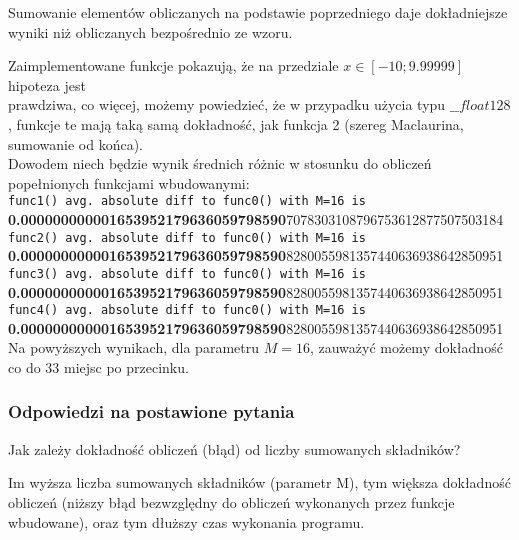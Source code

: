 \documentclass[12pt]{article}
\newenvironment{question}[2][Pytanie]{\begin{trivlist}
\item[\hskip \labelsep {\bfseries #1}\hskip \labelsep {\bfseries #2.}]}{\end{trivlist}}
\newenvironment{hypothesis}[2][Hipoteza]{\begin{trivlist}
\item[\hskip \labelsep {\bfseries #1}\hskip \labelsep {\bfseries #2.}]}{\end{trivlist}}
\begin{document}
\begin{hypothesis}{3}
Sumowanie elementów obliczanych na podstawie poprzedniego daje dokładniejsze wyniki niż obliczanych bezpośrednio ze wzoru.
\end{hypothesis}
Zaimplementowane funkcje pokazują, że na przedziale $x \in [-10;9.99999]$ hipoteza jest \\prawdziwa, co więcej, możemy powiedzieć, że w przypadku użycia typu $\_\_float128$, funkcje te mają taką samą dokładność, jak funkcja 2 (szereg Maclaurina, sumowanie od końca).\\
Dowodem niech będzie wynik średnich różnic w stosunku do obliczeń popełnionych funkcjami wbudowanymi:\\
\noindent\texttt{func1() avg. absolute diff to func0() with M=16 is}\\
\textsc{\textbf{0.000000000001653952179636059798590}7078303108796753612877507503184}\\
\texttt{func2() avg. absolute diff to func0() with M=16 is}\\
\textsc{\textbf{0.000000000001653952179636059798590}828005598135744063693864285095}1\\
\texttt{func3() avg. absolute diff to func0() with M=16 is}\\
\textsc{\textbf{0.000000000001653952179636059798590}8280055981357440636938642850951}\\
\texttt{func4() avg. absolute diff to func0() with M=16 is}\\
\textsc{\textbf{0.000000000001653952179636059798590}8280055981357440636938642850951}\\
Na powyższych wynikach, dla parametru $M = 16$, zauważyć możemy dokładność co do 33 miejsc po przecinku.

\subsubsection{Odpowiedzi na postawione pytania}
\begin{question}{1}
Jak zależy dokładność obliczeń (błąd) od liczby sumowanych składników?
\end{question}
Im wyższa liczba sumowanych składników (parametr M), tym większa dokładność obliczeń (niższy błąd bezwzględny do obliczeń wykonanych przez funkcje wbudowane), oraz tym dłuższy czas wykonania programu.
\end{document}
